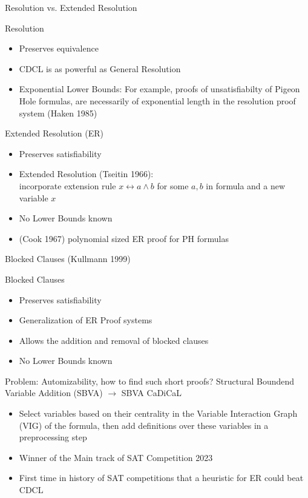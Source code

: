 \documentclass[t]{sdqbeamer}
\begin{document}
\begin{frame}{Resolution vs. Extended Resolution}
\begin{block}{Resolution}
\begin{itemize}\setlength{\itemsep}{1ex}
    \item Preserves equivalence
    \item CDCL is as powerful as General Resolution
    \item Exponential Lower Bounds: For example, proofs of unsatisfiabilty of Pigeon Hole formulas, are necessarily of exponential length in the resolution proof system (Haken 1985)
\end{itemize}
\end{block}
\begin{block}{Extended Resolution (ER)}
\begin{itemize}\setlength{\itemsep}{1ex}
    \item Preserves satisfiability
    \item Extended Resolution (Tseitin 1966):\\
    incorporate extension rule $x \leftrightarrow a \land b$ for some $a,b$ in formula and a new variable $x$
    \item No Lower Bounds known
    \item (Cook 1967) polynomial sized ER proof for PH formulas
\end{itemize}
\end{block}
\end{frame}


\begin{frame}{Blocked Clauses (Kullmann 1999)}
\begin{block}{Blocked Clauses}
\begin{itemize}\setlength{\itemsep}{1ex}
    \item Preserves satisfiability
    \item Generalization of ER Proof systems
    \item Allows the addition and removal of blocked clauses
    \item No Lower Bounds known
\end{itemize}
\end{block}
\pause
\begin{block}{Problem: Automizability, how to find such short proofs?}
Structural Boundend Variable Addition (SBVA) $\rightarrow$ SBVA CaDiCaL
\begin{itemize}\setlength{\itemsep}{1ex}
    \item Select variables based on their centrality in the Variable Interaction Graph (VIG) of the formula, then add definitions over these variables in a preprocessing step
    \item Winner of the Main track of SAT Competition 2023
    \item First time in history of SAT competitions that a heuristic for ER could beat CDCL
\end{itemize}
\end{block}
\end{frame}
\end{document}
